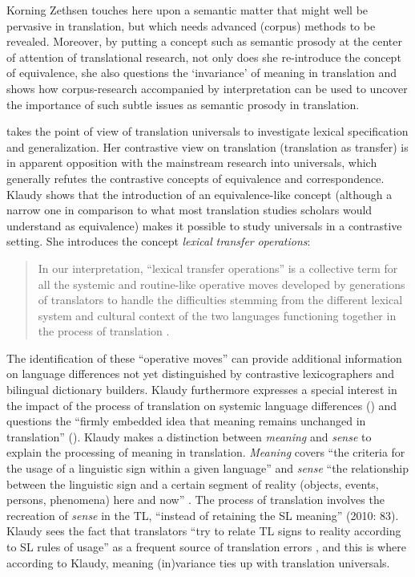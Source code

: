 Korning Zethsen touches here upon a semantic matter that might well be pervasive in translation, but which needs advanced (corpus) methods to be revealed. Moreover, by putting a concept such as semantic prosody at the center of attention of translational research, not only does she re-introduce the concept of equivalence, she also questions the ‘invariance’ of meaning in translation and shows how corpus-research accompanied by interpretation can be used to uncover the importance of such subtle issues as semantic prosody in translation.

\citet{lewandowska-tomasczyk_specification_2010} takes the point of view of translation universals to investigate lexical specification and generalization. Her contrastive view on translation (translation as transfer) is in apparent opposition with the mainstream research into universals, which generally refutes the contrastive concepts of equivalence and correspondence. Klaudy shows that the introduction of an equivalence-like concept (although a narrow one in comparison to what most translation studies scholars would understand as equivalence) makes it possible to study universals in a contrastive setting. She introduces the concept \textit{lexical} \textit{transfer} \textit{operations}:

\begin{quote}
In our interpretation, “lexical transfer operations” is a collective term for all the systemic and routine-like operative moves developed by generations of translators to handle the difficulties stemming from the different lexical system and cultural context of the two languages functioning together in the process of translation \citep[81]{lewandowska-tomasczyk_specification_2010}.
\end{quote}

The identification of these “operative moves” can provide additional information on language differences not yet distinguished by contrastive lexicographers and bilingual dictionary builders. Klaudy furthermore expresses a special interest in the impact of the process of translation on systemic language differences (\citeyear[82]{lewandowska-tomasczyk_specification_2010}) and questions the “firmly embedded idea that meaning remains unchanged in translation” (\citeyear[82]{lewandowska-tomasczyk_specification_2010}). Klaudy makes a distinction between \textit{meaning} and \textit{sense} to explain the processing of meaning in translation. \textit{Meaning} covers “the criteria for the usage of a linguistic sign within a given language” and \textit{sense} “the relationship between the linguistic sign and a certain segment of reality (objects, events, persons, phenomena) here and now” \citep[83]{lewandowska-tomasczyk_specification_2010}. The process of translation involves the recreation of \textit{sense} in the TL, “instead of retaining the SL meaning” (2010: 83). Klaudy sees the fact that translators “try to relate TL signs to reality according to SL rules of usage” as a frequent source of translation errors \citep[83]{lewandowska-tomasczyk_specification_2010}, and this is where according to Klaudy, meaning (in)variance ties up with translation universals.

